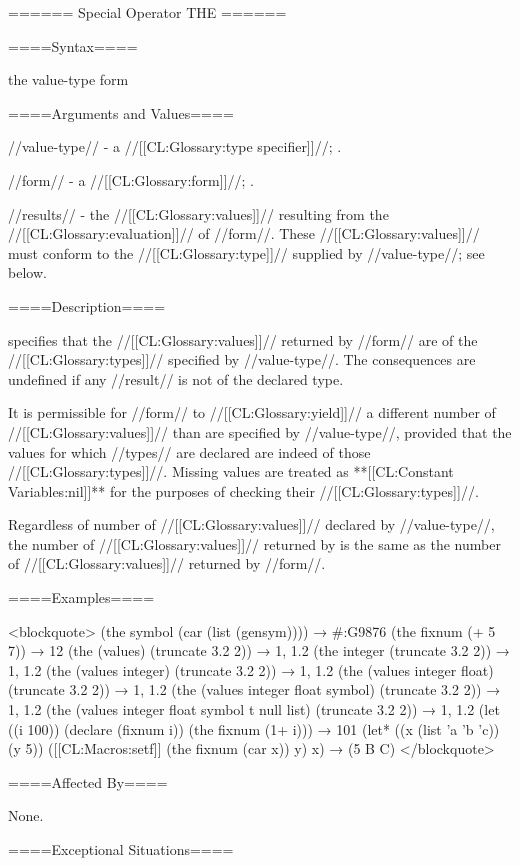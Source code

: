 ====== Special Operator THE ======

====Syntax====

\DefspecWithValues the {value-type form} {}

====Arguments and Values====

//value-type// - a //[[CL:Glossary:type specifier]]//; \noeval.

//form// - a //[[CL:Glossary:form]]//; \eval.

//results// - the //[[CL:Glossary:values]]// resulting from the //[[CL:Glossary:evaluation]]// of //form//. These //[[CL:Glossary:values]]// must conform to the //[[CL:Glossary:type]]// supplied by //value-type//; see below.

====Description====

 specifies that the //[[CL:Glossary:values]]// returned by //form// are of the //[[CL:Glossary:types]]// specified by //value-type//. The consequences are undefined if any //result// is not of the declared type.

It is permissible for //form// to //[[CL:Glossary:yield]]// a different number of //[[CL:Glossary:values]]// than are specified by //value-type//, provided that the values for which //types// are declared are indeed of those //[[CL:Glossary:types]]//. Missing values are treated as **[[CL:Constant Variables:nil]]** for the purposes of checking their //[[CL:Glossary:types]]//.

Regardless of number of //[[CL:Glossary:values]]// declared by //value-type//, the number of //[[CL:Glossary:values]]// returned by  is the same as the number of //[[CL:Glossary:values]]// returned by //form//.

====Examples====

<blockquote> (the symbol (car (list (gensym)))) → #:G9876 (the fixnum (+ 5 7)) → 12 (the (values) (truncate 3.2 2)) → 1, 1.2 (the integer (truncate 3.2 2)) → 1, 1.2 (the (values integer) (truncate 3.2 2)) → 1, 1.2 (the (values integer float) (truncate 3.2 2)) → 1, 1.2 (the (values integer float symbol) (truncate 3.2 2)) → 1, 1.2 (the (values integer float symbol t null list) (truncate 3.2 2)) → 1, 1.2 (let ((i 100)) (declare (fixnum i)) (the fixnum (1+ i))) → 101 (let* ((x (list 'a 'b 'c)) (y 5)) ([[CL:Macros:setf]] (the fixnum (car x)) y) x) → (5 B C) </blockquote>

====Affected By====

None.

====Exceptional Situations====

